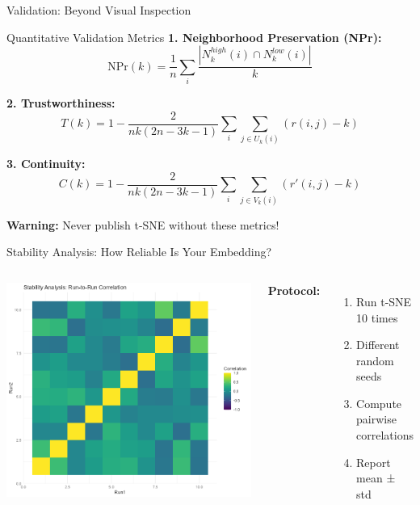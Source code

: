 \documentclass[aspectratio=169]{beamer}
\newcommand{\warning}[1]{\colorbox{red!10}{\textcolor{warningcolor}{\textbf{Warning:} #1}}}
\begin{document}
\begin{frame}{Validation: Beyond Visual Inspection}
\begin{block}{Quantitative Validation Metrics}
\textbf{1. Neighborhood Preservation (NPr):}
$$\text{NPr}(k) = \frac{1}{n}\sum_i \frac{|N_k^{high}(i) \cap N_k^{low}(i)|}{k}$$

\textbf{2. Trustworthiness:}
$$T(k) = 1 - \frac{2}{nk(2n-3k-1)}\sum_i \sum_{j \in U_k(i)} (r(i,j) - k)$$

\textbf{3. Continuity:}
$$C(k) = 1 - \frac{2}{nk(2n-3k-1)}\sum_i \sum_{j \in V_k(i)} (r'(i,j) - k)$$
\end{block}

\warning{Never publish t-SNE without these metrics!}
\end{frame}

\begin{frame}{Stability Analysis: How Reliable Is Your Embedding?}
\begin{columns}
\includegraphics[width=\textwidth]{./Figures/stability_analysis.png}

\textbf{Protocol:}
\begin{enumerate}
\item Run t-SNE 10 times
\item Different random seeds
\item Compute pairwise correlations
\item Report mean ± std
\end{enumerate}


\end{columns}
\end{frame}
\end{document}
